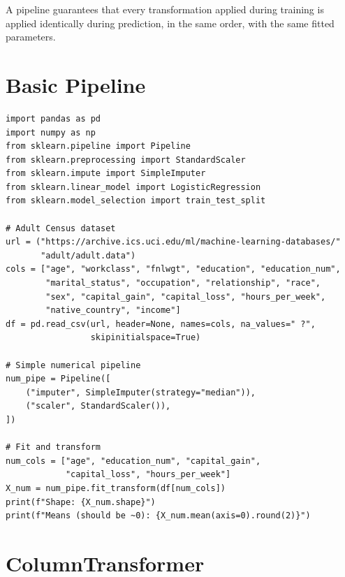 \begin{datatip}
A pipeline guarantees that every transformation applied during training is applied identically during prediction, in the same order, with the same fitted parameters.
\end{datatip}

\section{Basic Pipeline}

\begin{verbatim}
import pandas as pd
import numpy as np
from sklearn.pipeline import Pipeline
from sklearn.preprocessing import StandardScaler
from sklearn.impute import SimpleImputer
from sklearn.linear_model import LogisticRegression
from sklearn.model_selection import train_test_split

# Adult Census dataset
url = ("https://archive.ics.uci.edu/ml/machine-learning-databases/"
       "adult/adult.data")
cols = ["age", "workclass", "fnlwgt", "education", "education_num",
        "marital_status", "occupation", "relationship", "race",
        "sex", "capital_gain", "capital_loss", "hours_per_week",
        "native_country", "income"]
df = pd.read_csv(url, header=None, names=cols, na_values=" ?",
                 skipinitialspace=True)

# Simple numerical pipeline
num_pipe = Pipeline([
    ("imputer", SimpleImputer(strategy="median")),
    ("scaler", StandardScaler()),
])

# Fit and transform
num_cols = ["age", "education_num", "capital_gain",
            "capital_loss", "hours_per_week"]
X_num = num_pipe.fit_transform(df[num_cols])
print(f"Shape: {X_num.shape}")
print(f"Means (should be ~0): {X_num.mean(axis=0).round(2)}")
\end{verbatim}

\section{ColumnTransformer}

